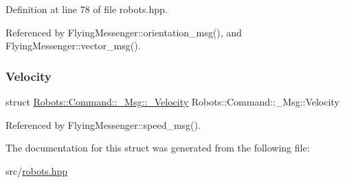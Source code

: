 Definition at line 78 of file robots.\+hpp.



Referenced by Flying\+Messenger\+::orientation\+\_\+msg(), and Flying\+Messenger\+::vector\+\_\+msg().

\mbox{\label{struct_robots_1_1_command_1_1___msg_a539fff26601e0902fcf867eab3e08d79}} 
\subsubsection{\texorpdfstring{Velocity}{Velocity}}
{\footnotesize\ttfamily struct \hyperlink{struct_robots_1_1_command_1_1___msg_1_1___velocity}{Robots\+::\+Command\+::\+\_\+\+Msg\+::\+\_\+\+Velocity}  Robots\+::\+Command\+::\+\_\+\+Msg\+::\+Velocity}



Referenced by Flying\+Messenger\+::speed\+\_\+msg().



The documentation for this struct was generated from the following file\+:\begin{DoxyCompactItemize}
\item 
src/\hyperlink{robots_8hpp}{robots.\+hpp}\end{DoxyCompactItemize}
